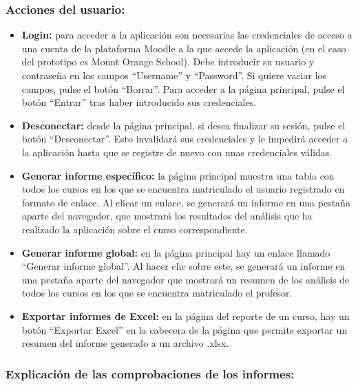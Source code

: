 \subsubsection{Acciones del usuario:}
    \begin{itemize}
    	\item
    	\textbf{Login:} para acceder a la aplicación son necesarias las
    	credenciales de acceso a una cuenta de la plataforma Moodle a la que
    	accede la aplicación (en el caso del prototipo es Mount Orange
    	School). Debe introducir su usuario y contraseña en los campos
    	``Username'' y ``Password''. Si quiere vaciar los campos, pulse el botón
    	``Borrar''. Para acceder a la página principal, pulse el botón ``Entrar''
    	tras haber introducido sus credenciales.
    	\item
    	\textbf{Desconectar:} desde la página principal, si desea finalizar su
    	sesión, pulse el botón ``Desconectar''. Esto invalidará sus credenciales
    	y le impedirá acceder a la aplicación hasta que se registre de nuevo
    	con unas credenciales válidas.
    	\item
    	\textbf{Generar informe específico:} la página principal muestra una
    	tabla con todos los cursos en los que se encuentra matriculado el
    	usuario registrado en formato de enlace. Al clicar un enlace, se
    	generará un informe en una pestaña aparte del navegador, que mostrará
    	los resultados del análisis que ha realizado la aplicación sobre el
    	curso correspondiente.
    	\item
    	\textbf{Generar informe global:} en la página principal hay un enlace
    	llamado ``Generar informe global''. Al hacer clic sobre este, se
    	generará un informe en una pestaña aparte del navegador que mostrará
    	un resumen de los análisis de todos los cursos en los que se encuentra
    	matriculado el profesor.
        \item
        \textbf{Exportar informes de Excel:} en la página del reporte de un curso, 
        hay un botón ``Exportar Excel'' en la cabecera de la página que permite exportar un resumen del
        informe generado a un archivo .xlsx.
        
    \end{itemize}
    
    \subsubsection{Explicación de las comprobaciones de los informes:}
    
